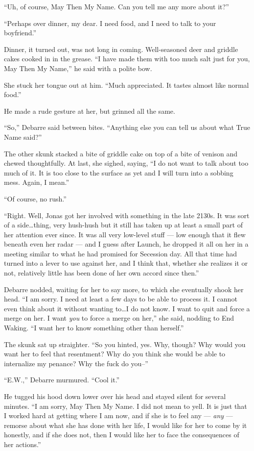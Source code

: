 ``Uh, of course, May Then My Name. Can you tell me any more about it?''

``Perhaps over dinner, my dear. I need food, and I need to talk to your boyfriend.''

Dinner, it turned out, was not long in coming. Well-seasoned deer and griddle cakes cooked in in the grease. ``I have made them with too much salt just for you, May Then My Name,'' he said with a polite bow.

She stuck her tongue out at him. ``Much appreciated. It tastes almost like normal food.''

He made a rude gesture at her, but grinned all the same.

``So,'' Debarre said between bites. ``Anything else you can tell us about what True Name said?''

The other skunk stacked a bite of griddle cake on top of a bite of venison and chewed thoughtfully. At last, she sighed, saying, ``I do not want to talk about too much of it. It is too close to the surface as yet and I will turn into a sobbing mess. Again, I mean.''

``Of course, no rush.''

``Right. Well, Jonas got her involved with something in the late 2130s. It was sort of a side\ldots thing, very hush-hush but it still has taken up at least a small part of her attention ever since. It was all very low-level stuff — low enough that it flew beneath even her radar — and I guess after Launch, he dropped it all on her in a meeting similar to what he had promised for Secession day. All that time had turned into a lever to use against her, and I think that, whether she realizes it or not, relatively little has been done of her own accord since then.''

Debarre nodded, waiting for her to say more, to which she eventually shook her head. ``I am sorry. I need at least a few days to be able to process it. I cannot even think about it without wanting to\ldots I do not know. I want to quit and force a merge on her. I want \emph{you} to force a merge on her,'' she said, nodding to End Waking. ``I want her to know something other than herself.''

The skunk sat up straighter. ``So you hinted, yes. Why, though? Why would you want her to feel that resentment? Why do you think she would be able to internalize my penance? Why the fuck do you--''

``E.W.,'' Debarre murmured. ``Cool it.''

He tugged his hood down lower over his head and stayed silent for several minutes. ``I am sorry, May Then My Name. I did not mean to yell. It is just that I worked hard at getting where I am now, and if she is to feel any — \emph{any} — remorse about what she has done with her life, I would like for her to come by it honestly, and if she does not, then I would like her to face the consequences of her actions.''

